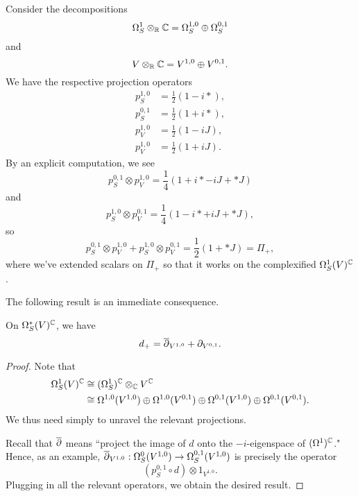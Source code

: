 Consider the decompositions
\[
\Omega^1_S \otimes_\mathbb R \mathbb C = \Omega^{1,0}_S \oplus \Omega^{0,1}_S
\]
and
\[
V \otimes_\mathbb R \mathbb C = V^{1,0} \oplus V^{0,1}.
\]
We have the respective projection operators
\begin{align*}
p^{1,0}_S &= \frac{1}{2}(1 - i \ast),\\
p^{0,1}_S &= \frac{1}{2}(1 + i \ast),\\
p^{1,0}_V &= \frac{1}{2}(1 - i J),\\
p^{1,0}_V &= \frac{1}{2}(1 + i J).
\end{align*}
By an explicit computation, we see
\[
p^{0,1}_S \otimes p^{1,0}_V  = \frac{1}{4} ( 1 +i \ast - i J + \ast J)
\]
and
\[
p^{1,0}_S \otimes p^{0,1}_V = \frac{1}{4} ( 1 - i \ast + i J + \ast J ),
\]
so
\[
p^{0,1}_S \otimes p^{1,0}_V + p^{1,0}_S \otimes p^{0,1}_V = \frac{1}{2} (1 + \ast J) = \Pi_+, 
\]
where we've extended scalars on $\Pi_+$ so that it works on the complexified $\Omega^1_S(V)^\mathbb C$. 

The following result is an immediate consequence.

\begin{lemma}
On $\Omega^*_S(V)^\mathbb C$, we have
\[
d_+ = \overline{\partial}_{V^{1,0}} + \partial_{V^{0,1}}.
\]
\end{lemma}

\begin{proof}
Note that
\begin{align*}
\Omega^1_S(V)^\mathbb C &\cong (\Omega^1_S)^\mathbb C \otimes_\mathbb C V^\mathbb C \\ 
&\cong \Omega^{1,0}(V^{1,0})\oplus \Omega^{1,0}(V^{0,1}) \oplus \Omega^{0,1}(V^{1,0}) \oplus \Omega^{0,1}(V^{0,1}).
\end{align*}
We thus need simply to unravel the relevant projections.

Recall that $\overline{\partial}$ means ``project the image of $d$ onto the $-i$-eigenspace of $(\Omega^1)^\mathbb C$." Hence, as an example, $\overline{\partial}_{V^{1,0}}: \Omega^0_S(V^{1,0}) \to \Omega^{0,1}_S(V^{1,0})$ is precisely the operator 
\[
(p ^{0,1}_S \circ d) \otimes 1_{V^{1,0}}.
\]
Plugging in all the relevant operators, we obtain the desired result.
\end{proof}

